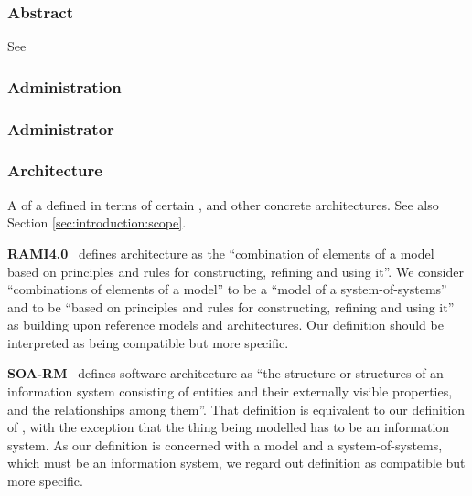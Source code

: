 %
%

{

\newcommand{\GlossaryEntry}[2]{\subsubsection*{#2}\label{sec:glossary:#1}}
\newcommand{\GlossaryNote}[2]{\begin{minipage}[b]{\dimexpr\linewidth-0.5cm\relax}\vspace*{0.33cm}\footnotesize{\textbf{#1}\ #2}\end{minipage}}

\GlossaryEntry{abstract}{Abstract}
See 

\GlossaryEntry{administration}{Administration}

\GlossaryEntry{administrator}{Administrator}

\GlossaryEntry{architecture}{Architecture}
A  of a  defined in terms of certain ,  and other concrete architectures.
See also Section \ref{sec:introduction:scope}.

	\GlossaryNote{RAMI4.0}{
	    defines architecture as the ``combination of elements of a model based on principles and rules for constructing, refining and using it''.
		We consider ``combinations of elements of a model'' to be a ``model of a system-of-systems'' and to be ``based on principles and rules for constructing, refining and using it'' as building upon reference models and architectures.
		Our definition should be interpreted as being compatible but more specific.
	}

	\GlossaryNote{SOA-RM}{
		defines software architecture as ``the structure or structures of an information system consisting of entities and their externally visible properties, and the relationships among them''.
		That definition is equivalent to our definition of \GlossaryHyperRef{model}{model}, with the exception that the thing being modelled has to be an information system.
		As our definition is concerned with a model and a system-of-systems, which must be an information system, we regard out definition as compatible but more specific.
	}

}
